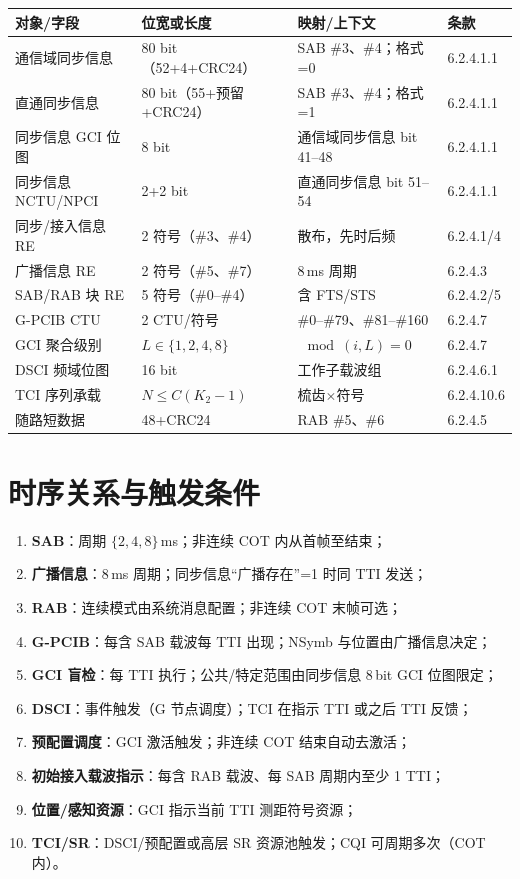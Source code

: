 \documentclass[11pt,a4paper]{ctexart}
\begin{document}
\begin{table}[h]
\centering
\small
\begin{tabular}{llll}
\toprule
\textbf{对象/字段} & \textbf{位宽或长度} & \textbf{映射/上下文} & \textbf{条款} \\
\midrule
通信域同步信息 & 80 bit（52+4+CRC24） & SAB \#3、\#4；格式=0 & 6.2.4.1.1 \\
直通同步信息 & 80 bit（55+预留+CRC24） & SAB \#3、\#4；格式=1 & 6.2.4.1.1 \\
同步信息 GCI 位图 & 8 bit & 通信域同步信息 bit 41--48 & 6.2.4.1.1 \\
同步信息 NCTU/NPCI & 2+2 bit & 直通同步信息 bit 51--54 & 6.2.4.1.1 \\
同步/接入信息 RE & 2 符号（\#3、\#4） & 散布，先时后频 & 6.2.4.1/4 \\
广播信息 RE & 2 符号（\#5、\#7） & 8\,ms 周期 & 6.2.4.3 \\
SAB/RAB 块 RE & 5 符号（\#0--\#4） & 含 FTS/STS & 6.2.4.2/5 \\
G-PCIB CTU & 2 CTU/符号 & \#0--\#79、\#81--\#160 & 6.2.4.7 \\
GCI 聚合级别 & $L\in\{1,2,4,8\}$ & $\mod(i,L){=}0$ & 6.2.4.7 \\
DSCI 频域位图 & 16 bit & 工作子载波组 & 6.2.4.6.1 \\
TCI 序列承载 & $N\leq C(K_2{-}1)$ & 梳齿$\times$符号 & 6.2.4.10.6 \\
随路短数据 & 48+CRC24 & RAB \#5、\#6 & 6.2.4.5 \\
\bottomrule
\end{tabular}
\end{table}

\section{时序关系与触发条件}

\begin{enumerate}[nosep]
  \item \textbf{SAB}：周期 $\{2,4,8\}$\,ms；非连续 COT 内从首帧至结束；
  \item \textbf{广播信息}：8\,ms 周期；同步信息``广播存在''=1 时同 TTI 发送；
  \item \textbf{RAB}：连续模式由系统消息配置；非连续 COT 末帧可选；
  \item \textbf{G-PCIB}：每含 SAB 载波每 TTI 出现；NSymb 与位置由广播信息决定；
  \item \textbf{GCI 盲检}：每 TTI 执行；公共/特定范围由同步信息 8\,bit GCI 位图限定；
  \item \textbf{DSCI}：事件触发（G 节点调度）；TCI 在指示 TTI 或之后 TTI 反馈；
  \item \textbf{预配置调度}：GCI 激活触发；非连续 COT 结束自动去激活；
  \item \textbf{初始接入载波指示}：每含 RAB 载波、每 SAB 周期内至少 1 TTI；
  \item \textbf{位置/感知资源}：GCI 指示当前 TTI 测距符号资源；
  \item \textbf{TCI/SR}：DSCI/预配置或高层 SR 资源池触发；CQI 可周期多次（COT 内）。
\end{enumerate}
\end{document}
